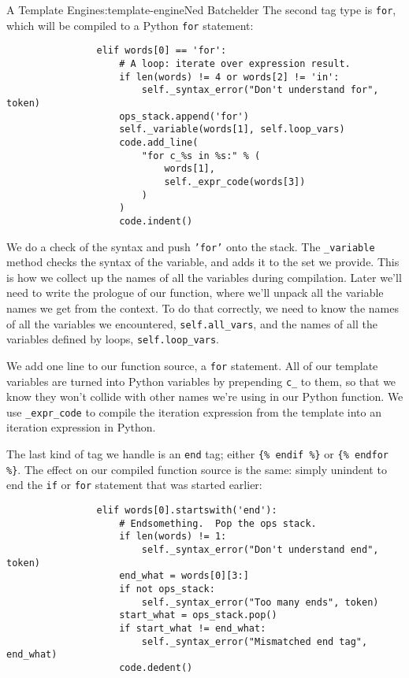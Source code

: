 \begin{aosachapter}{A Template Engine}{s:template-engine}{Ned Batchelder}
The second tag type is \texttt{for}, which will be compiled to a Python
\texttt{for} statement:

\begin{verbatim}
                elif words[0] == 'for':
                    # A loop: iterate over expression result.
                    if len(words) != 4 or words[2] != 'in':
                        self._syntax_error("Don't understand for", token)
                    ops_stack.append('for')
                    self._variable(words[1], self.loop_vars)
                    code.add_line(
                        "for c_%s in %s:" % (
                            words[1],
                            self._expr_code(words[3])
                        )
                    )
                    code.indent()
\end{verbatim}

We do a check of the syntax and push \texttt{'for'} onto the stack. The
\texttt{\_variable} method checks the syntax of the variable, and adds
it to the set we provide. This is how we collect up the names of all the
variables during compilation. Later we'll need to write the prologue of
our function, where we'll unpack all the variable names we get from the
context. To do that correctly, we need to know the names of all the
variables we encountered, \texttt{self.all\_vars}, and the names of all
the variables defined by loops, \texttt{self.loop\_vars}.

We add one line to our function source, a \texttt{for} statement. All of
our template variables are turned into Python variables by prepending
\texttt{c\_} to them, so that we know they won't collide with other
names we're using in our Python function. We use \texttt{\_expr\_code}
to compile the iteration expression from the template into an iteration
expression in Python.

The last kind of tag we handle is an \texttt{end} tag; either
\texttt{\{\% endif \%\}} or \texttt{\{\% endfor \%\}}. The effect on our
compiled function source is the same: simply unindent to end the
\texttt{if} or \texttt{for} statement that was started earlier:

\begin{verbatim}
                elif words[0].startswith('end'):
                    # Endsomething.  Pop the ops stack.
                    if len(words) != 1:
                        self._syntax_error("Don't understand end", token)
                    end_what = words[0][3:]
                    if not ops_stack:
                        self._syntax_error("Too many ends", token)
                    start_what = ops_stack.pop()
                    if start_what != end_what:
                        self._syntax_error("Mismatched end tag", end_what)
                    code.dedent()
\end{verbatim}


\end{aosachapter}
